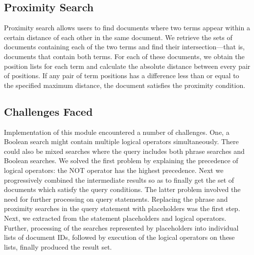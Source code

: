 \subsection*{Proximity Search}

Proximity search allows users to find documents where two terms appear within a certain distance of each other in the same document. We retrieve the sets of documents containing each of the two terms and find their intersection—that is, documents that contain both terms. For each of these documents, we obtain the position lists for each term and calculate the absolute distance between every pair of positions. If any pair of term positions has a difference less than or equal to the specified maximum distance, the document satisfies the proximity condition.

\subsection*{Challenges Faced}

Implementation of this module encountered a number of challenges.
One, a Boolean search might contain multiple logical operators simultaneously. There could also be mixed searches where the query includes both phrase searches and Boolean searches. We solved the first problem by explaining the precedence of logical operators: the NOT operator has the highest precedence. Next we progressively combined the intermediate results so as to finally get the set of documents which satisfy the query conditions.
The latter problem involved the need for further processing on query statements. Replacing the phrase and proximity searches in the query statement with placeholders was the first step. Next, we extracted from the statement placeholders and logical operators. Further, processing of the searches represented by placeholders into individual lists of document IDs, followed by execution of the logical operators on these lists, finally produced the result set.